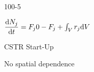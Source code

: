 \begin{mitframe}{100-5}
\begin{listone}
	\item $\dfrac{\mathrm{d}\massspecflux{j}}{\mathrm{d}\timet}=\force_j\init-\force_j+\int_{\vol}\pos_j\mathrm{d}\vol$
    	\begin{listtwo}
        	\item CSTR Start-Up
            	\begin{listthree}
                	\item No spatial dependence
                \end{listthree}
        \end{listtwo}
\end{listone}    
\end{mitframe}